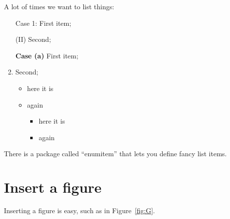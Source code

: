 \documentclass{article}
\theoremstyle{definition}
\theoremstyle{remark}
\begin{document}
A lot of times we want to list things:

\begin{itemize}
    \item[Case 1:] First item;
    \item[(II)] Second;
\end{itemize}

\begin{enumerate}
    \item[{\bf Case (a)}] First item;
    \item Second;
    \begin{itemize}
        \item here it is
        \item again
        \begin{itemize}
        \item here it is
        \item again
    \end{itemize}
    \end{itemize}
\end{enumerate}

There is a package called ``enumitem'' that lets you define fancy list items.

\section{Insert a figure}

Inserting a figure is easy, such as in Figure~\ref{fig:G}.
\end{document}
